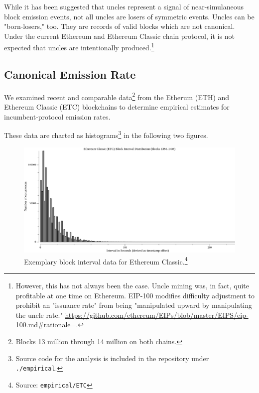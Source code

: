 \documentclass[11pt]{article}
\begin{document}
	While it has been suggested that uncles represent a signal of near-simulaneous block emission events,
	not all uncles are losers of symmetric events.
	Uncles can be "born-losers," too. They are records of valid blocks which are not canonical.
	Under the current Ethereum and Ethereum Classic chain protocol,
	it is not expected that uncles are intentionally produced.\footnote{
		However, this has not always been the case.
		Uncle mining was, in fact, quite profitable at one time on Ethereum.
		EIP-100 modifies difficulty adjustment to prohibit an "issuance rate" from being
		"manipulated upward by manipulating the uncle rate."
		\url{https://github.com/ethereum/EIPs/blob/master/EIPS/eip-100.md#rationale=}.
	}

	\subsection{\normalsize{Canonical Emission Rate}}

	We examined recent and comparable data\footnote{
		Blocks 13 million through 14 million on both chains.
	} from the Etherum (ETH) and Ethereum Classic (ETC) blockchains
	to determine empirical estimates for incumbent-protocol emission rates.

	These data are charted as histograms\footnote{
		Source code for the analysis is included in the repository under \texttt{./empirical}.
	} in the following two figures.

	\begin{figure}[tph!]
		\centering
		\includegraphics[width=1.0\textwidth]{vis_data_blockinterval_distribution_ETC.png}
		\caption{
			Exemplary block interval data for Ethereum Classic.\footnote{Source: \texttt{empirical/ETC}}
		}
	\end{figure}
\end{document}
